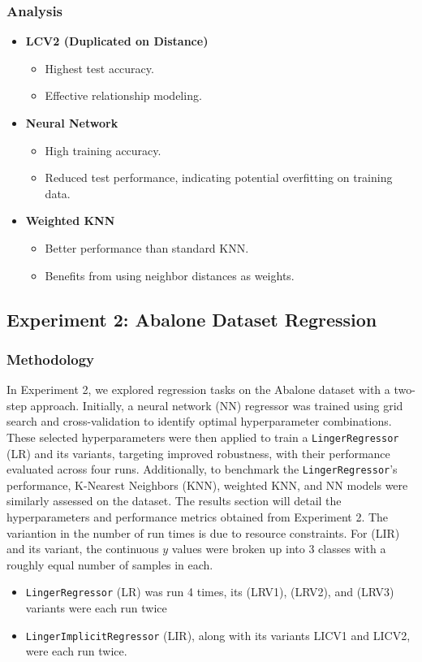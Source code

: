 \documentclass[a4paper, 12pt]{report}
\begin{document}
\subsubsection{Analysis}
\begin{itemize}
    \item \textbf{LCV2 (Duplicated on Distance)}
    \begin{itemize}
        \item Highest test accuracy.
        \item Effective relationship modeling.
    \end{itemize}
    
    \item \textbf{Neural Network}
    \begin{itemize}
        \item High training accuracy.
        \item Reduced test performance, indicating potential overfitting on training data.
    \end{itemize}
    
    \item \textbf{Weighted KNN}
    \begin{itemize}
        \item Better performance than standard KNN.
        \item Benefits from using neighbor distances as weights.
    \end{itemize}
\end{itemize}

\subsection{Experiment 2: Abalone Dataset Regression}
\subsubsection{Methodology}
\label{exp:2Abalone}
In Experiment 2, we explored regression tasks on the Abalone dataset with a two-step approach. 
Initially, a neural network (NN) regressor was trained using grid search and cross-validation to identify optimal hyperparameter combinations. 
These selected hyperparameters were then applied to train a \texttt{LingerRegressor} (LR) and its variants, targeting improved robustness, 
with their performance evaluated across four runs. Additionally, to benchmark the \texttt{LingerRegressor}'s performance, K-Nearest Neighbors (KNN), 
weighted KNN, and NN models were similarly assessed on the dataset. The results section will detail the hyperparameters and performance metrics obtained from Experiment 2.
The variantion in the number of run times is due to resource constraints. 
For (LIR) and its variant, the continuous $y$ values were broken up into 3 classes with a roughly equal number of samples in each.
\begin{itemize}
    \item \texttt{LingerRegressor} (LR) was run 4 times, its (LRV1), (LRV2), and (LRV3) variants were each run twice
    \item \texttt{LingerImplicitRegressor} (LIR), along with its variants LICV1 and LICV2, were each run twice.
\end{itemize}
\end{document}
